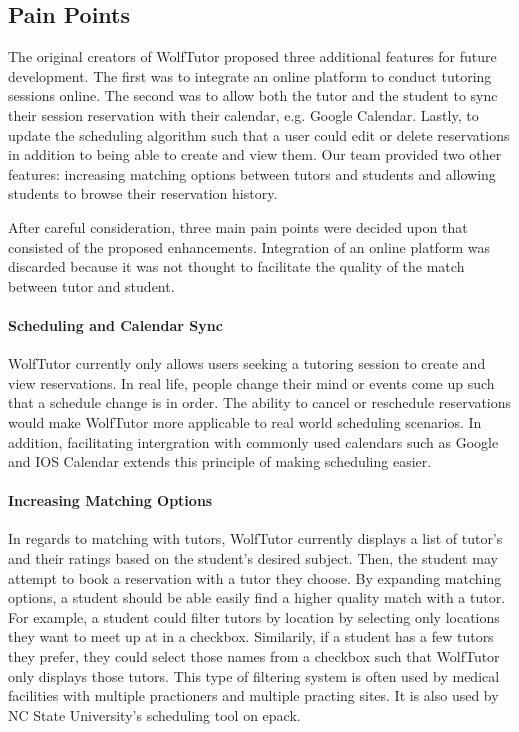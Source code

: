 

\subsection{Pain Points}
\label{sec:pain-points} The original creators of WolfTutor proposed
three additional features for future development. The first was to
integrate an online platform to conduct tutoring sessions online. The
second was to allow both the tutor and the student to sync their
session reservation with their calendar, e.g. Google Calendar. Lastly,
to update the scheduling algorithm such that a user could edit or
delete reservations in addition to being able to create and view
them. Our team provided two other features: increasing matching
options between tutors and students and allowing students to browse
their reservation history.

After careful consideration, three main pain points were decided upon
that consisted of the proposed enhancements. Integration of an online
platform was discarded because it was not thought to facilitate the
quality of the match between tutor and student.

\paragraph{Scheduling and Calendar Sync} WolfTutor currently only
allows users seeking a tutoring session to create and view
reservations. In real life, people change their mind or events come up
such that a schedule change is in order. The ability to cancel or
reschedule reservations would make WolfTutor more applicable to real
world scheduling scenarios. In addition, facilitating intergration
with commonly used calendars such as Google and IOS Calendar extends
this principle of making scheduling easier.

\paragraph{Increasing Matching Options} In regards to matching with
tutors, WolfTutor currently displays a list of tutor's and their
ratings based on the student's desired subject. Then, the student may
attempt to book a reservation with a tutor they choose. By expanding
matching options, a student should be able easily find a higher
quality match with a tutor. For example, a student could filter tutors
by location by selecting only locations they want to meet up at in a
checkbox. Similarily, if a student has a few tutors they prefer, they
could select those names from a checkbox such that WolfTutor only
displays those tutors. This type of filtering system is often used by
medical facilities with multiple practioners and multiple practing
sites. It is also used by NC State University's scheduling tool on
epack.

